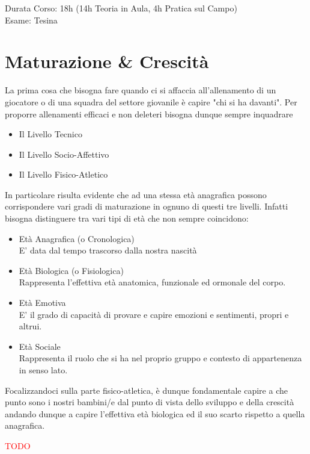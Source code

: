 \documentclass[../uefaC.tex]{subfiles}
\begin{document}

Durata Corso: 18h (14h Teoria in Aula, 4h Pratica sul Campo) \hfill \\
Esame: Tesina

\section{Maturazione \& Crescità}

La prima cosa che bisogna fare quando ci si affaccia all'allenamento di un giocatore o di una squadra del settore giovanile è capire "chi si ha davanti". Per proporre allenamenti efficaci e non deleteri bisogna dunque sempre inquadrare
\begin{itemize}
    \item{Il Livello Tecnico}
    \item{Il Livello Socio-Affettivo}
    \item{Il Livello Fisico-Atletico}
\end{itemize}

In particolare risulta evidente che ad una stessa età anagrafica possono corrispondere vari gradi di maturazione in ognuno di questi tre livelli. Infatti bisogna distinguere tra vari tipi di età che non sempre coincidono:
\begin{itemize}
    \item{Età Anagrafica (o Cronologica)}\hfill \\E' data dal tempo trascorso dalla nostra nascità
    \item{Età Biologica (o Fisiologica)}\hfill \\Rappresenta l'effettiva età anatomica, funzionale ed ormonale del corpo.
    \item{Età Emotiva}\hfill \\E' il grado di capacità di provare e capire emozioni e sentimenti, propri e altrui.
    \item{Età Sociale}\hfill \\Rappresenta il ruolo che si ha nel proprio gruppo e contesto di appartenenza in senso lato.
\end{itemize}

Focalizzandoci sulla parte fisico-atletica, è dunque fondamentale capire a che punto sono i nostri bambini/e dal punto di vista dello sviluppo e della crescità andando dunque a capire l'effettiva età biologica ed il suo scarto rispetto a quella anagrafica.

\textcolor{red}{TODO}
\end{document}
